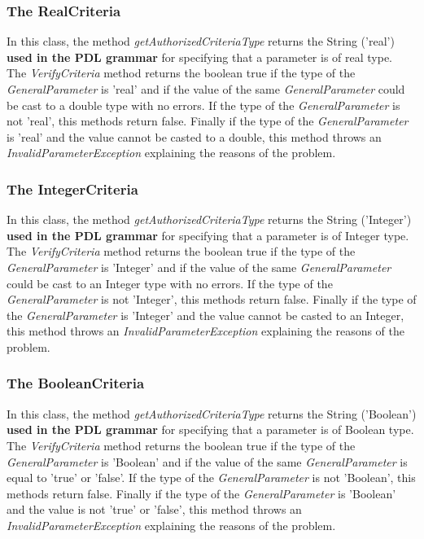 \documentclass[a4paper,11pt] {ivoa}
\begin{document}
\subsubsection{The RealCriteria}
In this class, the method {\it getAuthorizedCriteriaType} returns the String ('real') {\bf used in the PDL grammar} for specifying that a parameter is of real type.\\
The {\it VerifyCriteria} method returns the boolean true if the type of the {\it GeneralParameter} is 'real' and if the value of the same  {\it GeneralParameter} could be cast to a double type with no errors. If the type of the  {\it GeneralParameter} is not 'real', this methods return false. Finally if the type of the {\it GeneralParameter} is 'real' and the value cannot be casted to a double, this method throws an {\it InvalidParameterException} explaining the reasons of the problem.

\subsubsection{The IntegerCriteria}
In this class, the method {\it getAuthorizedCriteriaType} returns the String ('Integer') {\bf used in the PDL grammar} for specifying that a parameter is of Integer type.\\
The {\it VerifyCriteria} method returns the boolean true if the type of the {\it GeneralParameter} is 'Integer' and if the value of the same  {\it GeneralParameter} could be cast to an Integer type with no errors. If the type of the  {\it GeneralParameter} is not 'Integer', this methods return false. Finally if the type of the {\it GeneralParameter} is 'Integer' and the value cannot be casted to an Integer, this method throws an {\it InvalidParameterException} explaining the reasons of the problem.

\subsubsection{The BooleanCriteria}
In this class, the method {\it getAuthorizedCriteriaType} returns the String ('Boolean') {\bf used in the PDL grammar} for specifying that a parameter is of Boolean type.\\
The {\it VerifyCriteria} method returns the boolean true if the type of the {\it GeneralParameter} is 'Boolean' and if the value of the same  {\it GeneralParameter} is equal to 'true' or 'false'. If the type of the  {\it GeneralParameter} is not 'Boolean', this methods return false. Finally if the type of the {\it GeneralParameter} is 'Boolean' and the value is not 'true' or 'false', this method throws an {\it InvalidParameterException} explaining the reasons of the problem.
\end{document}
